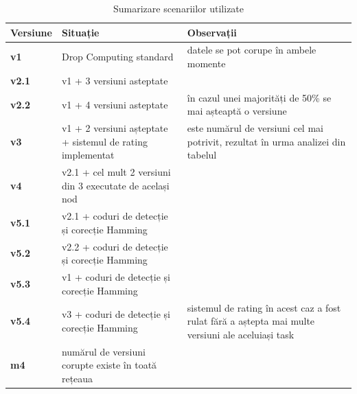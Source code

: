\documentclass[12pt,a4paper]{report}
\begin{document}
\begin{table}[th]\small\linespread{1}
\caption{Sumarizare scenariilor utilizate}
\label{tab:scenarii}
\begin{tabular}{l >{\raggedright\arraybackslash}p{8cm} >{\raggedright\arraybackslash}p{4cm}}
\textbf{Versiune} & \textbf{Situație} & \textbf{Observații} \\\hline
\textbf{v1} & Drop Computing standard &datele se pot corupe în ambele momente \\\hline
\textbf{v2.1} & v1 + 3 versiuni asteptate& \\\hline
\textbf{v2.2} & v1 + 4 versiuni asteptate &în cazul unei majorități de 50\% se mai așteaptă o versiune \\\hline
\textbf{v3} & v1 + 2 versiuni așteptate + sistemul de rating implementat &2 este numărul de versiuni cel mai potrivit, rezultat în urma analizei din tabelul  \\\hline
\textbf{v4} & v2.1 + cel mult 2 versiuni din 3 executate de același nod& \\\hline
\textbf{v5.1} & v2.1 + coduri de detecție și corecție Hamming& \\\hline
\textbf{v5.2} & v2.2 + coduri de detecție și corecție Hamming& \\\hline
\textbf{v5.3} & v1 + coduri de detecție și corecție Hamming& \\\hline
\textbf{v5.4} & v3 + coduri de detecție și corecție Hamming& sistemul de rating în acest caz a fost rulat fără a aștepta mai multe versiuni ale aceluiași task \\\hline
\textbf{m4} & numărul de versiuni corupte existe în toată rețeaua &\\
\hline
\end{tabular}
\end{table}
\end{document}
